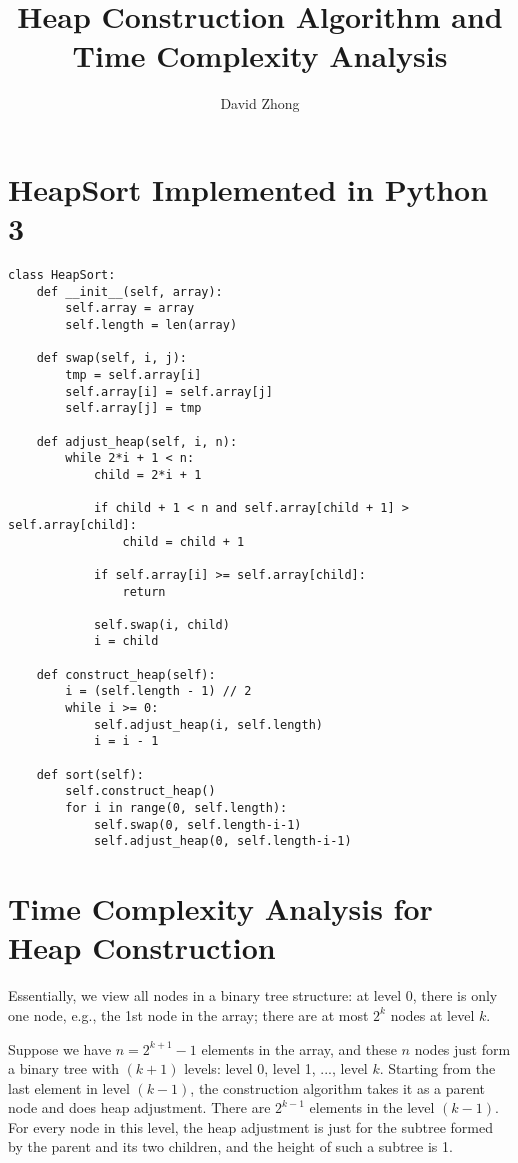 \documentclass[11pt, oneside]{article}   	%
\title{Heap Construction Algorithm and Time Complexity Analysis}
\author{David Zhong}
\begin{document}
\maketitle

\section{HeapSort Implemented in Python 3}
\begin{verbatim}
class HeapSort:
    def __init__(self, array):
        self.array = array
        self.length = len(array)

    def swap(self, i, j):
        tmp = self.array[i]
        self.array[i] = self.array[j]
        self.array[j] = tmp

    def adjust_heap(self, i, n):
        while 2*i + 1 < n:
            child = 2*i + 1
            
            if child + 1 < n and self.array[child + 1] > self.array[child]:
                child = child + 1

            if self.array[i] >= self.array[child]:
                return
            
            self.swap(i, child)
            i = child
        
    def construct_heap(self):
        i = (self.length - 1) // 2
        while i >= 0:
            self.adjust_heap(i, self.length)
            i = i - 1

    def sort(self):
        self.construct_heap()
        for i in range(0, self.length):
            self.swap(0, self.length-i-1)
            self.adjust_heap(0, self.length-i-1)

\end{verbatim}

\newpage
\section{Time Complexity Analysis for Heap Construction}
Essentially, we view all nodes in a binary tree structure: at level 0, there is only one node, e.g., the 1st node in the array;  there are at most $2^k$ nodes at level $k$.

Suppose we have $n = 2^{k+1}-1$ elements in the array, and these $n$ nodes just form a binary tree with $(k+1)$ levels: level 0, level 1, ..., level $k$. Starting from the last element in level $(k-1)$, the construction algorithm takes it as a parent node and does heap adjustment. There are $2^{k-1}$ elements in the level $(k-1)$. For every node in this level, the heap adjustment is just for the subtree formed by the parent and its two children, and the height of such a subtree is 1.
\end{document}
